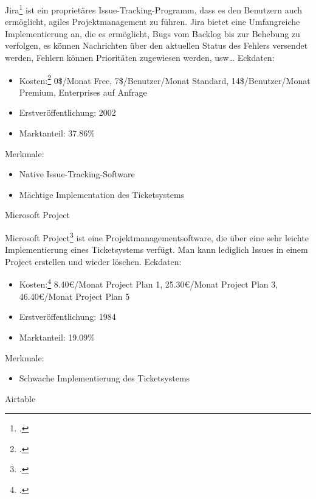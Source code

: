 Jira\footcite{jira} ist ein proprietäres Issue-Tracking-Programm, dass es den Benutzern auch ermöglicht, agiles Projektmanagement zu führen. Jira bietet eine Umfangreiche Implementierung an, die es ermöglicht, Bugs vom Backlog bis zur Behebung zu verfolgen, es können Nachrichten über den aktuellen Status des Fehlers versendet werden, Fehlern können Prioritäten zugewiesen werden, usw…		
Eckdaten:
\begin{itemize}
	\item Kosten:\footcite{jira-pricing} 0\$/Monat Free, 7\$/Benutzer/Monat Standard, 14\$/Benutzer/Monat Premium, Enterprises auf Anfrage
	\item Erstveröffentlichung: 2002
	\item Marktanteil: 37.86\%
\end{itemize}				
Merkmale:
\begin{itemize}
	\item Native Issue-Tracking-Software
	\item Mächtige Implementation des Ticketsystems
\end{itemize}				
Microsoft Project

Microsoft Project\footcite{microsoft-project} ist eine Projektmanagementsoftware, die über eine sehr leichte Implementierung eines Ticketsystems verfügt. Man kann lediglich Issues in einem Project erstellen und wieder löschen.
Eckdaten:
\begin{itemize}
	\item Kosten:\footcite{microsoft-project-pricing} 8.40€/Monat Project Plan 1, 25.30€/Monat Project Plan 3, 46.40€/Monat Project Plan 5
	\item Erstveröffentlichung: 1984
	\item Marktanteil: 19.09\%
\end{itemize}
Merkmale:
\begin{itemize}
	\item Schwache Implementierung des Ticketsystems
\end{itemize}				
Airtable

